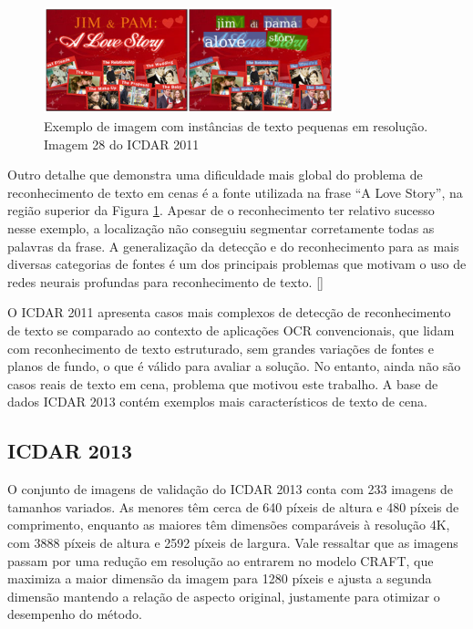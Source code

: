 \begin{figure}
    \centering
    \includegraphics[width=0.75\textwidth]{figs/resultados-icdar11-03.png}
    \caption{Exemplo de imagem com instâncias de texto pequenas em resolução. Imagem 28 do ICDAR 2011}
    \label{fig:results_icdar11_03}
\end{figure}

Outro detalhe que demonstra uma dificuldade mais global do problema de reconhecimento de texto em cenas é a fonte utilizada 
na frase “A Love Story”, na região superior da Figura \ref{fig:results_icdar11_03}. Apesar de o reconhecimento ter relativo 
sucesso nesse exemplo, a localização não conseguiu segmentar corretamente todas as palavras da frase. A generalização da detecção 
e do reconhecimento para as mais diversas categorias de fontes é um dos principais problemas que motivam o uso de redes neurais 
profundas para reconhecimento de texto. []

O ICDAR 2011 apresenta casos mais complexos de detecção de reconhecimento de texto se comparado ao contexto de aplicações OCR 
convencionais, que lidam com reconhecimento de texto estruturado, sem grandes variações de fontes e planos de fundo, o que é 
válido para avaliar a solução. No entanto, ainda não são casos reais de texto em cena, problema que motivou este trabalho. 
A base de dados ICDAR 2013 contém exemplos mais característicos de texto de cena.


\subsection{ICDAR 2013}\label{sec:results_icdar_2013}

O conjunto de imagens de validação do ICDAR 2013 conta com 233 imagens de tamanhos variados. As menores têm cerca de 640 píxeis 
de altura e 480 píxeis de comprimento, enquanto as maiores têm dimensões comparáveis à resolução 4K, com 3888 píxeis de altura e 
2592 píxeis de largura. Vale ressaltar que as imagens passam por uma redução em resolução ao entrarem no modelo CRAFT, que 
maximiza a maior dimensão da imagem para 1280 píxeis e ajusta a segunda dimensão mantendo a relação de aspecto original, justamente 
para otimizar o desempenho do método.

